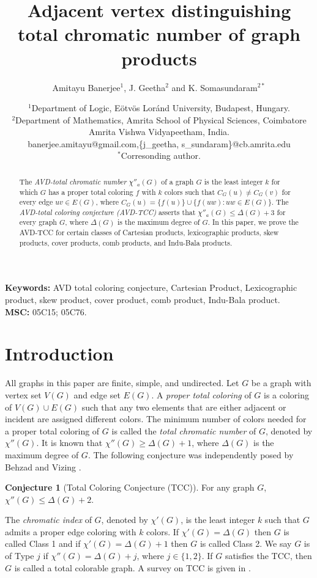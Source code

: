 \documentclass[12pt]{article}
\title{Adjacent vertex distinguishing total chromatic number of graph products}
\author{Amitayu Banerjee$^{1}$, J. Geetha$^2$  and K. Somasundaram$^{2*}$}
\date{}
\date{\small{$^1$Department of Logic, E\"otv\"os Lor\'and University, Budapest, Hungary.}\\
\small{$^2$Department of Mathematics, Amrita School of Physical Sciences, Coimbatore \\ Amrita Vishwa Vidyapeetham, India.\\
 banerjee.amitayu@gmail.com,\{j\_geetha, s\_sundaram\}@cb.amrita.edu}\\
 $^*$Corresonding author.}
\theoremstyle{definition}
\newtheorem{conjecture}[defn]{Conjecture}
\begin{document}
\maketitle


\begin{abstract}
The {\em AVD-total chromatic number} $\chi''_{a}(G)$ of a graph $G$ is the least integer $k$ for which $G$ has a proper total coloring $f$ with $k$ colors such that $C_G(u)\neq C_G(v)$ for every edge $uv\in E(G)$, where $C_G(u)=\{f(u)\}\cup\{f(uw):uw\in E(G)\}$.
The {\em AVD-total coloring conjecture (AVD-TCC)} asserts that $\chi''_{a}(G)\leq \Delta(G)+3$ for every graph $G$, where $\Delta(G)$ is the maximum degree of $G$.
In this paper, we prove the AVD-TCC for certain classes of Cartesian products, lexicographic products, skew products, cover products, comb products, and Indu-Bala products.
\end{abstract}


\noindent\textbf{Keywords:} AVD total coloring conjecture, Cartesian Product, Lexicographic product, skew product, cover product, comb product, Indu-Bala product.\\
\noindent\textbf{MSC:} 05C15; 05C76.

\section{Introduction}

All graphs in this paper are finite, simple, and undirected. 
Let $G$ be a graph with vertex set $V(G)$ and edge set $E(G)$.
A \emph{proper total coloring} of $G$ is a coloring of $V(G)\cup E(G)$ such that any two
elements that are either adjacent or incident are assigned different colors.
The minimum number of colors needed for a proper total coloring of $G$ is called the \emph{total chromatic number} of $G$, denoted by $\chi''(G)$. It is known that $\chi''(G) \geq \Delta(G)+1$, where $\Delta(G)$ is the maximum degree of $G$. 
The following conjecture was independently posed by Behzad \cite{Beh1965} and Vizing \cite{Viz1968}. 

\begin{conjecture}[Total Coloring Conjecture (TCC)]\label{Conjecture 1.1}
For any graph $G$, $\chi''(G) \leq \Delta(G) + 2$.
\end{conjecture}

The {\em chromatic index} of $G$, denoted by $\chi'(G)$, is the least integer $k$ such that $G$ admits a proper edge coloring with $k$ colors.
If $\chi'(G)=\Delta(G)$ then $G$ is called Class 1 and if $\chi'(G)=\Delta(G)+1$ then $G$ is called Class 2. We say
$G$ is
of Type $j$ if $\chi''(G) = \Delta(G) + j$, where $j\in\{1,2\}$. If $G$ satisfies the TCC, then $G$ is called a total colorable graph.
A survey on TCC is given in \cite{GNS2023}.
\end{document}
